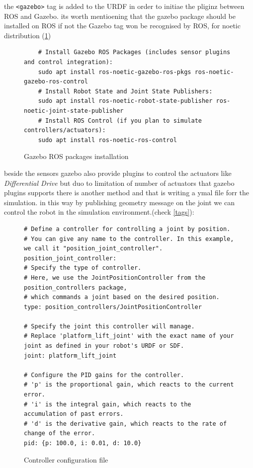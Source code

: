 \documentclass[../../main]{subfiles}
\begin{document}
the \texttt{<gazebo>} tag is added to the URDF in order to initiae the pliginz between ROS and Gazebo.
its worth mentioening that the gazebo package should be installed on ROS if not the Gazebo tag won be recognised by ROS, for noetic distribution (\cref{gazebo ROS packages installation})
\begin{figure}[h!]
  
  \begin{verbatim}
    # Install Gazebo ROS Packages (includes sensor plugins and control integration):
    sudo apt install ros-noetic-gazebo-ros-pkgs ros-noetic-gazebo-ros-control
    # Install Robot State and Joint State Publishers:
    sudo apt install ros-noetic-robot-state-publisher ros-noetic-joint-state-publisher
    # Install ROS Control (if you plan to simulate controllers/actuators):
    sudo apt install ros-noetic-ros-control
  \end{verbatim} 
  \caption{Gazebo ROS packages installation}
  \label{gazebo ROS packages installation}
\end{figure}
\newpage
beside the sensors gazebo also provide plugins to control the actuators like \emph{Differential Drive}
but duo to limitation of number of actuators that gazebo plugins supports there is another method and that is writing a ymal file forr the simulation.
in this way by publishing geometry message on the joint we can control the robot in the simulation environment.(check \cref{tags}):
\begin{figure}
  \centering
  \begin{verbatim}
# Define a controller for controlling a joint by position.
# You can give any name to the controller. In this example, we call it "position_joint_controller".
position_joint_controller:
# Specify the type of controller.
# Here, we use the JointPositionController from the position_controllers package,
# which commands a joint based on the desired position.
type: position_controllers/JointPositionController

# Specify the joint this controller will manage.
# Replace 'platform_lift_joint' with the exact name of your joint as defined in your robot's URDF or SDF.
joint: platform_lift_joint

# Configure the PID gains for the controller.
# 'p' is the proportional gain, which reacts to the current error.
# 'i' is the integral gain, which reacts to the accumulation of past errors.
# 'd' is the derivative gain, which reacts to the rate of change of the error.
pid: {p: 100.0, i: 0.01, d: 10.0}
\end{verbatim}
\caption{Controller configuration file}
\label{yaml}
\end{figure}
\end{document}
